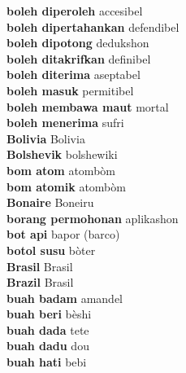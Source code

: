 \textbf{ boleh diperoleh  } accesibel \\
\textbf{ boleh dipertahankan  } defendibel \\
\textbf{ boleh dipotong  } dedukshon \\
\textbf{ boleh ditakrifkan  } definibel \\
\textbf{ boleh diterima  } aseptabel \\
\textbf{ boleh masuk  } permitibel \\
\textbf{ boleh membawa maut  } mortal \\
\textbf{ boleh menerima  } sufri \\
\textbf{ Bolivia  } Bolivia \\
\textbf{ Bolshevik  } bolshewiki \\
\textbf{ bom atom  } atombòm \\
\textbf{ bom atomik  } atombòm \\
\textbf{ Bonaire  } Boneiru \\
\textbf{ borang permohonan  } aplikashon \\
\textbf{ bot api  } bapor (barco) \\
\textbf{ botol susu  } bòter \\
\textbf{ Brasil  } Brasil \\
\textbf{ Brazil  } Brasil \\
\textbf{ buah badam  } amandel \\
\textbf{ buah beri  } bèshi \\
\textbf{ buah dada  } tete \\
\textbf{ buah dadu  } dou \\
\textbf{ buah hati  } bebi \\
